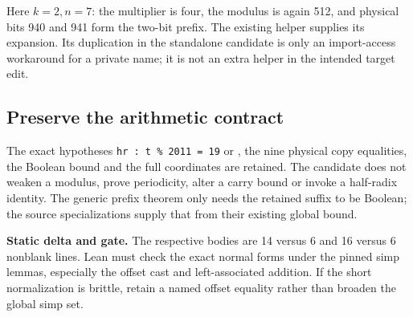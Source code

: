 Here $k=2,n=7$: the multiplier is four, the modulus is again 512, and
physical bits 940 and 941 form the two-bit prefix. The existing
 helper supplies its expansion. Its duplication in the
standalone candidate is only an import-access workaround for a private
name; it is not an extra helper in the intended target edit.

\subsection{Preserve the arithmetic contract}

The exact hypotheses \texttt{hr : t \% 2011 = 19} or , the nine physical
copy equalities, the Boolean bound and the full 
coordinates are retained. The candidate does not weaken a modulus, prove
periodicity, alter a carry bound or invoke a half-radix identity. The generic
prefix theorem only needs the retained suffix to be Boolean; the source
specializations supply that from their existing global bound.

\textbf{Static delta and gate.} The respective bodies are 14 versus 6 and
16 versus 6 nonblank lines. Lean must check the exact normal forms under the
pinned simp lemmas, especially the offset cast and left-associated addition.
If the short normalization is brittle, retain a named offset equality rather
than broaden the global simp set.
